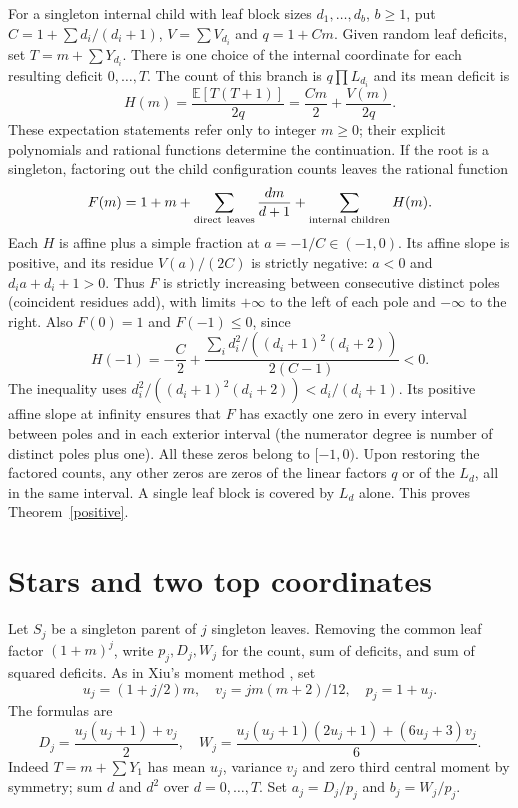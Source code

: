 \documentclass[11pt]{article}
\newcommand{\E}{\mathbb E}
\begin{document}
For a singleton internal child with leaf block sizes $d_1,\dots,d_b$,
$b\ge1$, put $C=1+\sum d_i/(d_i+1)$, $V=\sum V_{d_i}$ and $q=1+Cm$.
Given random leaf deficits, set $T=m+\sum Y_{d_i}$. There is one choice
of the internal coordinate for each resulting deficit $0,\dots,T$.
The count of this branch is $q\prod L_{d_i}$ and its mean deficit is
\[
        H(m)=\frac{\E[T(T+1)]}{2q}=\frac{Cm}{2}+\frac{V(m)}{2q}.
\]
These expectation statements refer only to integer $m\ge0$;
their explicit polynomials and rational functions determine the continuation.
If the root is a singleton, factoring out the child configuration counts
leaves the rational function
\[
 F(m)=1+m+\sum_{\rm direct\ leaves}\frac{dm}{d+1}
              +\sum_{\rm internal\ children} H(m).
\]
Each $H$ is affine plus a simple fraction at $a=-1/C\in(-1,0)$.
Its affine slope is positive, and its residue $V(a)/(2C)$ is strictly
negative: $a<0$ and $d_i a+d_i+1>0$. Thus $F$ is strictly increasing
between consecutive distinct poles (coincident residues add), with
limits $+\infty$ to the left of each pole and $-\infty$ to the right.
Also $F(0)=1$ and $F(-1)\le0$, since
\[
 H(-1)=-\frac C2+
 \frac{\sum_i d_i^2/((d_i+1)^2(d_i+2))}{2(C-1)}<0.
\]
The inequality uses $d_i^2/((d_i+1)^2(d_i+2))<d_i/(d_i+1)$.
Its positive affine slope at infinity ensures that $F$ has exactly one
zero in every interval between poles and in each exterior interval
(the numerator degree is number of distinct poles plus one).
All these zeros belong to $[-1,0)$. Upon restoring the factored counts,
any other zeros are zeros of the linear factors $q$ or of the
$L_d$, all in the same interval. A single leaf block is covered by $L_d$
alone. This proves Theorem~\ref{positive}.

\section{Stars and two top coordinates}
Let $S_j$ be a singleton parent of $j$ singleton leaves. Removing the
common leaf factor $(1+m)^j$, write $p_j,D_j,W_j$ for the count, sum of
deficits, and sum of squared deficits. As in Xiu's moment method
\cite{xiu}, set
\[
 u_j=(1+j/2)m,\quad v_j=jm(m+2)/12,\quad p_j=1+u_j.
\]
The formulas are
\begin{equation}\label{mom}
 D_j=\frac{u_j(u_j+1)+v_j}{2},\quad
 W_j=\frac{u_j(u_j+1)(2u_j+1)+(6u_j+3)v_j}{6}.
\end{equation}
Indeed $T=m+\sum Y_1$ has mean $u_j$, variance $v_j$ and zero third
central moment by symmetry; sum $d$ and $d^2$ over $d=0,\ldots,T$.
Set $a_j=D_j/p_j$ and $b_j=W_j/p_j$.
\end{document}
